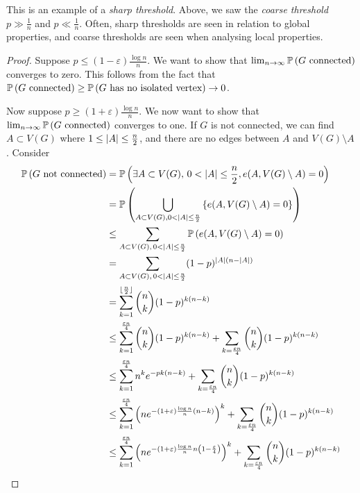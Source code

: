 \begin{remark}
	This is an example of a \emph{sharp threshold}.
	Above, we saw the \emph{coarse threshold} \( p \gg \frac 1 n \) and \( p \ll \frac 1 n \).
	Often, sharp thresholds are seen in relation to global properties, and coarse thresholds are seen when analysing local properties.
\end{remark}
\begin{proof}
	Suppose \( p \leq (1-\varepsilon) \frac{\log n}{n} \).
	We want to show that \( \lim_{n \to \infty} \mathbb{P}\left({G \text{ connected}}\right) \) converges to zero.
	This follows from the fact that \( \mathbb{P}\left({G \text{ connected}}\right) \geq \mathbb{P}\left({G \text{ has no isolated vertex}}\right) \to 0 \).

	Now suppose \( p \geq (1 + \varepsilon) \frac{\log n}{n} \).
	We now want to show that \( \lim_{n \to \infty} \mathbb{P}\left({G \text{ connected}}\right) \) converges to one.
	If \( G \) is not connected, we can find \( A \subset V(G) \) where \( 1 \leq \abs{A} \leq \frac{n}{2} \), and there are no edges between \( A \) and \( V(G) \setminus A \).
	Consider
	\begin{align*}
		\prob{G \text{ not connected}} &= \prob{\exists A \subset V(G),\, 0 < \abs{A} \leq \frac{n}{2}, e(A, V(G) \setminus A) = 0} \\
		&= \prob{\bigcup_{A \subset V(G), 0 < \abs{A} \leq \frac{n}{2}} \qty{e(A, V(G) \setminus A) = 0}} \\
		&\leq \sum_{A \subset V(G),\, 0 < \abs{A} \leq \frac{n}{2}} \prob{e(A, V(G) \setminus A) = 0} \\
		&= \sum_{A \subset V(G),\, 0 < \abs{A} \leq \frac{n}{2}} (1-p)^{\abs{A}(n-\abs{A})} \\
		&= \sum_{k=1}^{\floor{\frac{n}{2}}} \binom{n}{k} (1-p)^{k (n-k)} \\
		&\leq \sum_{k=1}^{\frac{\varepsilon n}{4}} \binom n k (1-p)^{k (n-k)} + \sum_{k=\frac{\varepsilon n}{4}} \binom n k (1-p)^{k (n - k)} \\
		&\leq \sum_{k=1}^{\frac{\varepsilon n}{4}} n^k e^{-pk(n-k)} + \sum_{k=\frac{\varepsilon n}{4}} \binom n k (1-p)^{k (n - k)} \\
		&\leq \sum_{k=1}^{\frac{\varepsilon n}{4}} \qty(ne^{-(1+\varepsilon) \frac{\log n}{n} (n-k)})^k + \sum_{k=\frac{\varepsilon n}{4}} \binom n k (1-p)^{k (n - k)} \\
		&\leq \sum_{k=1}^{\frac{\varepsilon n}{4}} \qty(ne^{-(1+\varepsilon) \frac{\log n}{n} n\qty(1 - \frac{\varepsilon}{4})})^k + \sum_{k=\frac{\varepsilon n}{4}} \binom n k (1-p)^{k (n - k)} \\

\end{align*}
\end{proof}
